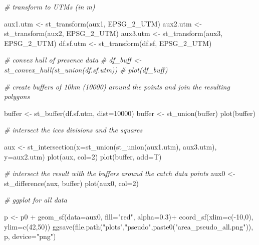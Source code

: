 \documentclass[
]{book}
\newenvironment{Shaded}{\begin{snugshade}}{\end{snugshade}}
\newcommand{\AttributeTok}[1]{\textcolor[rgb]{0.77,0.63,0.00}{#1}}
\newcommand{\CommentTok}[1]{\textcolor[rgb]{0.56,0.35,0.01}{\textit{#1}}}
\newcommand{\DecValTok}[1]{\textcolor[rgb]{0.00,0.00,0.81}{#1}}
\newcommand{\FloatTok}[1]{\textcolor[rgb]{0.00,0.00,0.81}{#1}}
\newcommand{\FunctionTok}[1]{\textcolor[rgb]{0.00,0.00,0.00}{#1}}
\newcommand{\NormalTok}[1]{#1}
\newcommand{\OtherTok}[1]{\textcolor[rgb]{0.56,0.35,0.01}{#1}}
\newcommand{\SpecialCharTok}[1]{\textcolor[rgb]{0.00,0.00,0.00}{#1}}
\newcommand{\StringTok}[1]{\textcolor[rgb]{0.31,0.60,0.02}{#1}}
\begin{document}
\begin{Shaded}
\begin{Highlighting}[]
\CommentTok{\# transform to UTMs (in m)}

\NormalTok{aux1.utm }\OtherTok{\textless{}{-}} \FunctionTok{st\_transform}\NormalTok{(aux1, EPSG\_2\_UTM)}
\NormalTok{aux2.utm }\OtherTok{\textless{}{-}} \FunctionTok{st\_transform}\NormalTok{(aux2, EPSG\_2\_UTM)}
\NormalTok{aux3.utm }\OtherTok{\textless{}{-}} \FunctionTok{st\_transform}\NormalTok{(aux3, EPSG\_2\_UTM)}
\NormalTok{df.sf.utm }\OtherTok{\textless{}{-}} \FunctionTok{st\_transform}\NormalTok{(df.sf, EPSG\_2\_UTM)}

\CommentTok{\# convex hull of presence data}
\CommentTok{\# df\_buff \textless{}{-} st\_convex\_hull(st\_union(df.sf.utm))}
\CommentTok{\# plot(df\_buff)}

\CommentTok{\# create buffers of 10km (10000) around the points and join the resulting polygons}

\NormalTok{buffer }\OtherTok{\textless{}{-}} \FunctionTok{st\_buffer}\NormalTok{(df.sf.utm, }\AttributeTok{dist=}\DecValTok{10000}\NormalTok{)}
\NormalTok{buffer }\OtherTok{\textless{}{-}} \FunctionTok{st\_union}\NormalTok{(buffer)}
\FunctionTok{plot}\NormalTok{(buffer)}

\CommentTok{\# intersect the ices divisions and the squares}

\NormalTok{aux }\OtherTok{\textless{}{-}} \FunctionTok{st\_intersection}\NormalTok{(}\AttributeTok{x=}\FunctionTok{st\_union}\NormalTok{(}\FunctionTok{st\_union}\NormalTok{(aux1.utm), aux3.utm), }\AttributeTok{y=}\NormalTok{aux2.utm)}
\FunctionTok{plot}\NormalTok{(aux, }\AttributeTok{col=}\DecValTok{2}\NormalTok{)}
\FunctionTok{plot}\NormalTok{(buffer, }\AttributeTok{add=}\NormalTok{T)}

\CommentTok{\# intersect the result with the buffers around the catch data points}
\NormalTok{aux0 }\OtherTok{\textless{}{-}} \FunctionTok{st\_difference}\NormalTok{(aux, buffer)}
\FunctionTok{plot}\NormalTok{(aux0, }\AttributeTok{col=}\DecValTok{2}\NormalTok{)}

\CommentTok{\# ggplot for all data}

\NormalTok{p }\OtherTok{\textless{}{-}}\NormalTok{ p0 }\SpecialCharTok{+}
  \FunctionTok{geom\_sf}\NormalTok{(}\AttributeTok{data=}\NormalTok{aux0, }\AttributeTok{fill=}\StringTok{"red"}\NormalTok{, }\AttributeTok{alpha=}\FloatTok{0.3}\NormalTok{)}\SpecialCharTok{+}
  \FunctionTok{coord\_sf}\NormalTok{(}\AttributeTok{xlim=}\FunctionTok{c}\NormalTok{(}\SpecialCharTok{{-}}\DecValTok{10}\NormalTok{,}\DecValTok{0}\NormalTok{), }\AttributeTok{ylim=}\FunctionTok{c}\NormalTok{(}\DecValTok{42}\NormalTok{,}\DecValTok{50}\NormalTok{))}
\FunctionTok{ggsave}\NormalTok{(}\FunctionTok{file.path}\NormalTok{(}\StringTok{"plots"}\NormalTok{,}\StringTok{"pseudo"}\NormalTok{,}\FunctionTok{paste0}\NormalTok{(}\StringTok{"area\_pseudo\_all.png"}\NormalTok{)), p, }\AttributeTok{device=}\StringTok{"png"}\NormalTok{)}


\end{Highlighting}
\end{Shaded}
\end{document}
